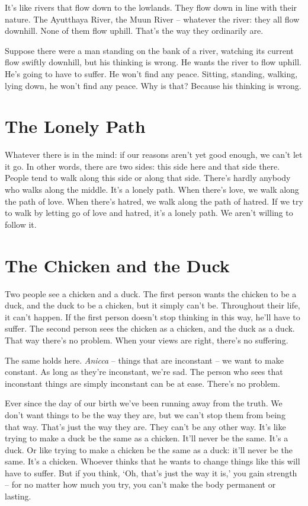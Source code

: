 It's like rivers that flow down to the lowlands. They flow down in line with their nature. The Ayutthaya River, the Muun River -- whatever the river: they all flow downhill. None of them flow uphill. That's the way they ordinarily are.

Suppose there were a man standing on the bank of a river, watching its current flow swiftly downhill, but his thinking is wrong. He wants the river to flow uphill. He's going to have to suffer. He won't find any peace. Sitting, standing, walking, lying down, he won't find any peace. Why is that? Because his thinking is wrong.

\section{The Lonely Path}

Whatever there is in the mind: if our reasons aren't yet good enough, we can't let it go. In other words, there are two sides: this side here and that side there. People tend to walk along this side or along that side. There's hardly anybody who walks along the middle. It's a lonely path. When there's love, we walk along the path of love. When there's hatred, we walk along the path of hatred. If we try to walk by letting go of love and hatred, it's a lonely path. We aren't willing to follow it.

\clearpage

\section{The Chicken and the Duck}

Two people see a chicken and a duck. The first person wants the chicken to be a duck, and the duck to be a chicken, but it simply can't be. Throughout their life, it can't happen. If the first person doesn't stop thinking in this way, he'll have to suffer. The second person sees the chicken as a chicken, and the duck as a duck. That way there's no problem. When your views are right, there's no suffering.

The same holds here. \textit{Anicca} -- things that are inconstant -- we want to make constant. As long as they're inconstant, we're sad. The person who sees that inconstant things are simply inconstant can be at ease. There's no problem.

Ever since the day of our birth we've been running away from the truth. We don't want things to be the way they are, but we can't stop them from being that way. That's just the way they are. They can't be any other way. It's like trying to make a duck be the same as a chicken. It'll never be the same. It's a duck. Or like trying to make a chicken be the same as a duck: it'll never be the same. It's a chicken. Whoever thinks that he wants to change things like this will have to suffer. But if you think, `Oh, that's just the way it is,' you gain strength -- for no matter how much you try, you can't make the body permanent or lasting.

